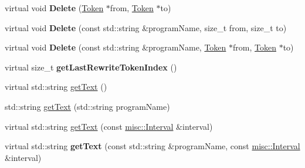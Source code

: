 \begin{DoxyCompactItemize}
\mbox{\label{classantlr4_1_1TokenStreamRewriter_a314c9dc3bc3aa1984229c2857f9a737c}} 
virtual void {\bfseries Delete} (\hyperlink{classantlr4_1_1Token}{Token} $\ast$from, \hyperlink{classantlr4_1_1Token}{Token} $\ast$to)
\item 
\mbox{\label{classantlr4_1_1TokenStreamRewriter_a1417d0eadb4c42e24540d6933672b9d7}} 
virtual void {\bfseries Delete} (const std\+::string \&program\+Name, size\+\_\+t from, size\+\_\+t to)
\item 
\mbox{\label{classantlr4_1_1TokenStreamRewriter_a5b38637af00a6c01e0f4bf9a3d34e6c4}} 
virtual void {\bfseries Delete} (const std\+::string \&program\+Name, \hyperlink{classantlr4_1_1Token}{Token} $\ast$from, \hyperlink{classantlr4_1_1Token}{Token} $\ast$to)
\item 
\mbox{\label{classantlr4_1_1TokenStreamRewriter_aa8af7cc9edaee1221aabdbcfbc7ec6ed}} 
virtual size\+\_\+t {\bfseries get\+Last\+Rewrite\+Token\+Index} ()
\item 
virtual std\+::string \hyperlink{classantlr4_1_1TokenStreamRewriter_a4c8eb9cc4661e42941c90278caa6fd29}{get\+Text} ()
\item 
std\+::string \hyperlink{classantlr4_1_1TokenStreamRewriter_a9891307cfb3f923da031a292965b7cf2}{get\+Text} (std\+::string program\+Name)
\item 
virtual std\+::string \hyperlink{classantlr4_1_1TokenStreamRewriter_a384a88f75b99b2a2dc75dac00ea805fe}{get\+Text} (const \hyperlink{classantlr4_1_1misc_1_1Interval}{misc\+::\+Interval} \&interval)
\item 
\mbox{\label{classantlr4_1_1TokenStreamRewriter_a3e5c55af743b11284fa2dd2e1fecc9ea}} 
virtual std\+::string {\bfseries get\+Text} (const std\+::string \&program\+Name, const \hyperlink{classantlr4_1_1misc_1_1Interval}{misc\+::\+Interval} \&interval)
\end{DoxyCompactItemize}
